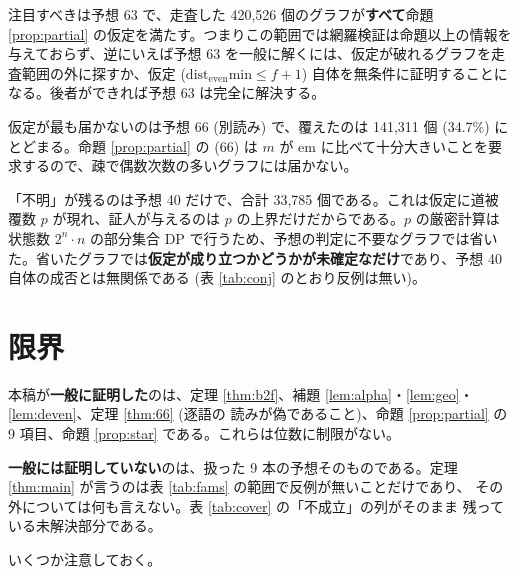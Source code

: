 \documentclass[paper=a4,fontsize=10.5pt,jafontsize=10.5pt]{jlreq}
\theoremstyle{plain}
\theoremstyle{definition}
\begin{document}
注目すべきは予想 63 で、走査した 420,526 個のグラフが\textbf{すべて}命題 \ref{prop:partial} の仮定を満たす。つまりこの範囲では網羅検証は命題以上の情報を与えておらず、逆にいえば予想 63 を一般に解くには、仮定が破れるグラフを走査範囲の外に探すか、仮定 ($\mathrm{dist_{even}min} \le f + 1$) 自体を無条件に証明することになる。後者ができれば予想 63 は完全に解決する。

仮定が最も届かないのは予想 66 (別読み) で、覆えたのは 141,311 個 (34.7\%) にとどまる。命題 \ref{prop:partial} の (66) は $m$ が $\mathrm{em}$ に比べて十分大きいことを要求するので、疎で偶数次数の多いグラフには届かない。

「不明」が残るのは予想 40 だけで、合計 33,785 個である。これは仮定に道被覆数 $p$ が現れ、証人が与えるのは $p$ の上界だけだからである。$p$ の厳密計算は状態数 $2^n \cdot n$ の部分集合 DP で行うため、予想の判定に不要なグラフでは省いた。省いたグラフでは\textbf{仮定が成り立つかどうかが未確定なだけ}であり、予想 40 自体の成否とは無関係である (表 \ref{tab:conj} のとおり反例は無い)。



\section{限界}\label{sec:limits}

本稿が\textbf{一般に証明した}のは、定理 \ref{thm:b2f}、補題
\ref{lem:alpha}・\ref{lem:geo}・\ref{lem:deven}、定理 \ref{thm:66} (逐語の
読みが偽であること)、命題 \ref{prop:partial} の 9 項目、命題 \ref{prop:star}
である。これらは位数に制限がない。

\textbf{一般には証明していない}のは、扱った 9 本の予想そのものである。定理
\ref{thm:main} が言うのは表 \ref{tab:fams} の範囲で反例が無いことだけであり、
その外については何も言えない。表 \ref{tab:cover} の「不成立」の列がそのまま
残っている未解決部分である。

いくつか注意しておく。
\end{document}
